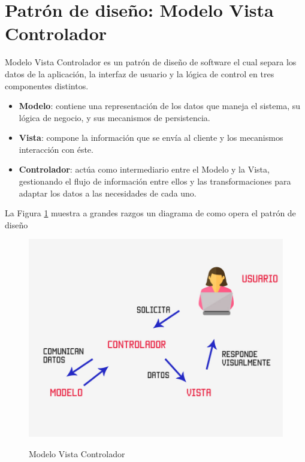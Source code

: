 \section{Patrón de diseño: Modelo Vista Controlador}
Modelo Vista Controlador es un patrón de diseño de software el cual separa los datos de la aplicación, la interfaz de usuario y la lógica de control en tres componentes distintos.\\

\begin{itemize}
	\item \textbf{Modelo}: contiene una representación de los datos que maneja el sistema, su lógica de negocio, y sus mecanismos de persistencia.
	
	\item \textbf{Vista}: compone la información que se envía al cliente y los mecanismos interacción con éste.
	
	\item \textbf{Controlador}: actúa como intermediario entre el Modelo y la Vista, gestionando el flujo de información entre ellos y las transformaciones para adaptar los datos a las necesidades de cada uno.
\end{itemize}

La Figura \ref{fig:mvc} muestra a grandes razgos un diagrama de como opera el patrón de diseño

\begin{figure}[htbp]
	\begin{center}
		\hypertarget{fig:mvc}{
			\includegraphics[scale=.3]{propuestaSolicion/turismo/images/mvc}
			\caption{Modelo Vista Controlador}
		}
		\label{fig:mvc}
	\end{center}
\end{figure}

